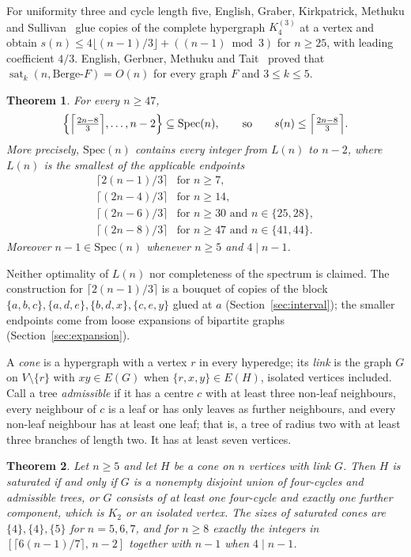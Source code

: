 \documentclass[11pt]{article}
\newtheorem{theorem}{Theorem}
\theoremstyle{remark}
\newcommand{\sat}{\operatorname{sat}}
\begin{document}
For uniformity three and cycle length five, English, Graber, Kirkpatrick,
Methuku and Sullivan~\cite[Theorem~5.7(2)]{EGKMS} glue copies of the
complete hypergraph $K_4^{(3)}$ at a vertex and obtain
$s(n)\le4\lfloor(n-1)/3\rfloor+((n-1)\bmod 3)$ for $n\ge25$, with leading
coefficient $4/3$. English, Gerbner, Methuku and Tait~\cite{EGMT} proved
that $\sat_k(n,\text{Berge-}F)=O(n)$ for every graph $F$ and $3\le k\le5$.

\begin{theorem}\label{thm:main}
For every $n\ge47$,
\[
\Bigl\{\Bigl\lceil\tfrac{2n-8}{3}\Bigr\rceil,\dots,n-2\Bigr\}\subseteq\mathrm{Spec}(n),
\qquad\text{so}\qquad s(n)\le\Bigl\lceil\tfrac{2n-8}{3}\Bigr\rceil .
\]
More precisely, $\mathrm{Spec}(n)$ contains every integer from $L(n)$ to
$n-2$, where $L(n)$ is the smallest of the applicable endpoints
\[
\begin{array}{ll}
\lceil 2(n-1)/3\rceil & \text{for } n\ge7,\\
\lceil (2n-4)/3\rceil & \text{for } n\ge14,\\
\lceil (2n-6)/3\rceil & \text{for } n\ge30 \text{ and } n\in\{25,28\},\\
\lceil (2n-8)/3\rceil & \text{for } n\ge47 \text{ and } n\in\{41,44\}.
\end{array}
\]
Moreover $n-1\in\mathrm{Spec}(n)$ whenever $n\ge5$ and $4\mid n-1$.
\end{theorem}

Neither optimality of $L(n)$ nor completeness of the spectrum is claimed.
The construction for $\lceil2(n-1)/3\rceil$ is a bouquet of copies of the
block $\{a,b,c\},\{a,d,e\},\{b,d,x\},\{c,e,y\}$ glued at $a$
(Section~\ref{sec:interval}); the smaller endpoints come from loose
expansions of bipartite graphs (Section~\ref{sec:expansion}).

A \emph{cone} is a hypergraph with a vertex $r$ in every hyperedge; its
\emph{link} is the graph $G$ on $V\setminus\{r\}$ with $xy\in E(G)$ when
$\{r,x,y\}\in E(H)$, isolated vertices included. Call a tree
\emph{admissible} if it has a centre $c$ with at least three non-leaf
neighbours, every neighbour of $c$ is a leaf or has only leaves as further
neighbours, and every non-leaf neighbour has at least one leaf; that is, a
tree of radius two with at least three branches of length two. It has at
least seven vertices.

\begin{theorem}\label{thm:cone}
Let $n\ge5$ and let $H$ be a cone on $n$ vertices with link $G$. Then $H$
is saturated if and only if $G$ is a nonempty disjoint union of four-cycles
and admissible trees, or $G$ consists of at least one four-cycle and exactly
one further component, which is $K_2$ or an isolated vertex. The sizes of
saturated cones are $\{4\},\{4\},\{5\}$ for $n=5,6,7$, and for $n\ge8$
exactly the integers in $[\lceil6(n-1)/7\rceil,\,n-2]$ together with $n-1$
when $4\mid n-1$.
\end{theorem}
\end{document}
